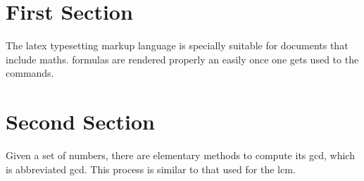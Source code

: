 \documentclass{article}
\begin{document}
\tableofcontents

\section{First Section}

The \Gls{latex} typesetting markup language is specially suitable for documents that include \gls{maths}. \Glspl{formula} are rendered properly an easily once one gets used to the commands.



\section{Second Section}

\vspace{5mm}

Given a set of numbers, there are elementary methods to compute its \acrlong{gcd}, which is abbreviated \acrshort{gcd}. This process is similar to that used for the \acrfull{lcm}.



\printglossary


\printglossary[type=\acronymtype]
\end{document}

